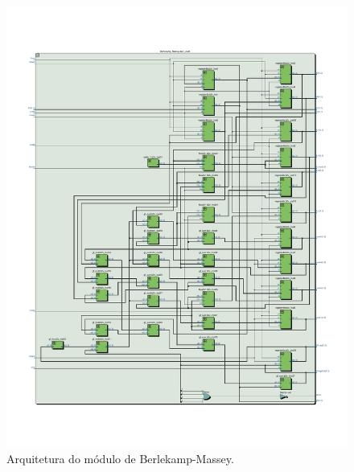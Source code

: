 \begin{figure}[h]
	\caption{\label{fig_berlekamp_arq}Arquitetura do módulo de Berlekamp-Massey.}
	\centering
	\includegraphics[width=1.0\textwidth, trim={0 1.2cm 0 3cm}, clip]{RS/BerlekampRTL.pdf}
\end{figure}

